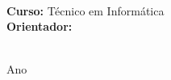 \documentclass[
    12pt,
    openright,
    oneside,
    a4paper,
    english,
    brazilian
    ]{abntex2}
\begin{document}
\frenchspacing

\imprimircapa

\makeatletter
\begin{cleardoublepage}
  \thispagestyle{empty}
  \begin{center}
    {\ABNTEXchapterfont\large\imprimirautor}
    \vfill
    \begin{center}
        {\ABNTEXchapterfont\bfseries\Large\imprimirtitulo}
    \end{center}
    \vfill
        \hspace{.45\textwidth}
        \begin{minipage}{.5\textwidth}
            \SingleSpacing
            \imprimirpreambulo\\
            \vspace{0.5cm}
            \textbf{Curso:} Técnico em Informática\\
            \textbf{Orientador:} \imprimirorientador
        \end{minipage}
    
    \vfill
    {\large\imprimirlocal}\\
    {\large Ano \imprimirdata}
\end{center}
\end{cleardoublepage}
\makeatother
\cleardoublepage

\setlength{\absparsep}{18pt}
\end{document}
